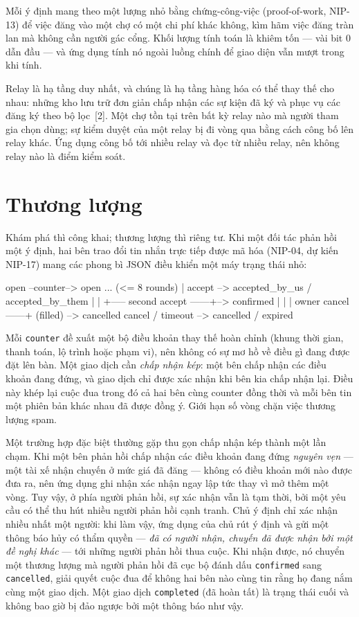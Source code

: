 \documentclass[11pt]{article}
\begin{document}
Mỗi ý định mang theo một lượng nhỏ bằng chứng-công-việc (proof-of-work,
NIP-13) để việc đăng vào một chợ có một chi phí khác không, kìm hãm việc đăng
tràn lan mà không cần người gác cổng. Khối lượng tính toán là khiêm tốn ---
vài bit 0 dẫn đầu --- và ứng dụng tính nó ngoài luồng chính để giao diện vẫn
mượt trong khi tính.

Relay là hạ tầng duy nhất, và chúng là hạ tầng hàng hóa có thể thay thế cho
nhau: những kho lưu trữ đơn giản chấp nhận các sự kiện đã ký và phục vụ các
đăng ký theo bộ lọc~[2]. Một chợ tồn tại trên bất kỳ relay nào mà người tham
gia chọn dùng; sự kiểm duyệt của một relay bị đi vòng qua bằng cách công bố
lên relay khác. Ứng dụng công bố tới nhiều relay và đọc từ nhiều relay, nên
không relay nào là điểm kiểm soát.

\section{Thương lượng}

Khám phá thì công khai; thương lượng thì riêng tư. Khi một đối tác phản hồi
một ý định, hai bên trao đổi tin nhắn trực tiếp được mã hóa (NIP-04, dự kiến
NIP-17) mang các phong bì JSON điều khiển một máy trạng thái nhỏ:

\begin{code}
open --counter--> open ... (<= 8 rounds)
  |
accept --> accepted_by_us / accepted_by_them
  |                          |
  +----- second accept ------+--> confirmed
  |                                  |
  |               owner cancel ------+ (filled) --> cancelled
cancel / timeout --> cancelled / expired
\end{code}

Mỗi \texttt{counter} đề xuất một bộ điều khoản thay thế hoàn chỉnh (khung thời
gian, thanh toán, lộ trình hoặc phạm vi), nên không có sự mơ hồ về điều gì
đang được đặt lên bàn. Một giao dịch cần \emph{chấp nhận kép}: một bên chấp
nhận các điều khoản đang đứng, và giao dịch chỉ được xác nhận khi bên kia chấp
nhận lại. Điều này khép lại cuộc đua trong đó cả hai bên cùng counter đồng
thời và mỗi bên tin một phiên bản khác nhau đã được đồng ý. Giới hạn số vòng
chặn việc thương lượng spam.

Một trường hợp đặc biệt thường gặp thu gọn chấp nhận kép thành một lần chạm.
Khi một bên phản hồi chấp nhận các điều khoản đang đứng \emph{nguyên vẹn} ---
một tài xế nhận chuyến ở mức giá đã đăng --- không có điều khoản mới nào được
đưa ra, nên ứng dụng ghi nhận xác nhận ngay lập tức thay vì mở thêm một vòng.
Tuy vậy, ở phía người phản hồi, sự xác nhận vẫn là tạm thời, bởi một yêu cầu
có thể thu hút nhiều người phản hồi cạnh tranh. Chủ ý định chỉ xác nhận nhiều
nhất một người: khi làm vậy, ứng dụng của chủ rút ý định và gửi một thông báo
hủy có thẩm quyền --- \emph{đã có người nhận, chuyến đã được nhận bởi một đề
nghị khác} --- tới những người phản hồi thua cuộc. Khi nhận được, nó chuyển
một thương lượng mà người phản hồi đã cục bộ đánh dấu \texttt{confirmed} sang
\texttt{cancelled}, giải quyết cuộc đua để không hai bên nào cùng tin rằng họ
đang nắm cùng một giao dịch. Một giao dịch \texttt{completed} (đã hoàn tất) là
trạng thái cuối và không bao giờ bị đảo ngược bởi một thông báo như vậy.
\end{document}
